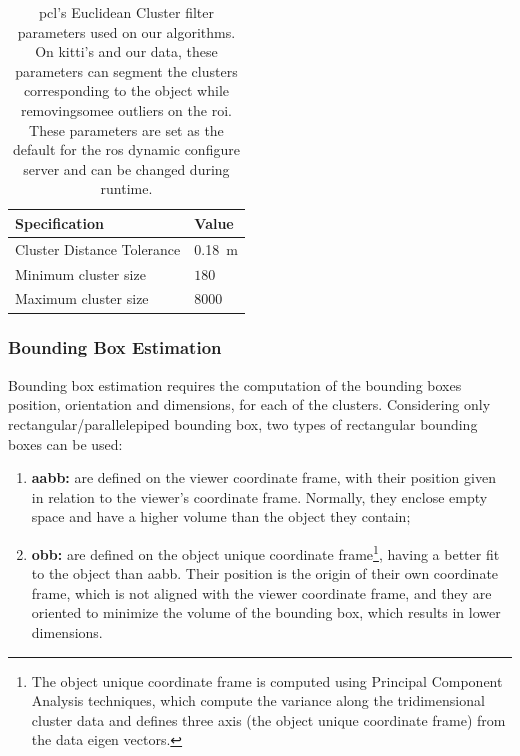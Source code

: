 \begin{table}[H]
	\centering
	\renewcommand{\arraystretch}{1.2}
	\begin{tabular}{@{}p{6cm}l@{}}
	 \toprule
	 Specification & Value \\
	 \midrule
	 Cluster Distance Tolerance & \SI{0.18}{\meter}\footnotemark \\
	 Minimum cluster size & $180$ \\
	 Maximum cluster size & $8000$ \\
	 \bottomrule
	\end{tabular}
	\caption{\ac{pcl}'s Euclidean Cluster filter parameters used on our algorithms. On \ac{kitti}'s and our data, these parameters can segment the clusters corresponding to the object while removingsomee outliers on the \ac{roi}. These parameters are set as the default for the \ac{ros} dynamic configure server and can be changed during runtime.}
	\label{tab:euclidian-cluster-specs}
\end{table}


\subsubsection{Bounding Box Estimation}
\label{subsubsec:object-detection:bounding-box-estimation}
Bounding box estimation requires the computation of the bounding boxes position, orientation and dimensions, for each of the clusters. Considering only rectangular/parallelepiped bounding box, two types of rectangular bounding boxes can be used:

\begin{enumerate}
	\item \textbf{\ac{aabb}:} are defined on the viewer coordinate frame, with their position given in relation to the viewer's coordinate frame. Normally, they enclose empty space and have a  higher volume than the object they contain;
	\item \textbf{\ac{obb}:} are defined on the object unique coordinate frame\footnote{The object unique coordinate frame is computed using Principal Component Analysis techniques, which compute the variance along the tridimensional cluster data and defines three axis (the object unique coordinate frame) from the data eigen vectors.}, having a better fit to the object than \ac{aabb}. Their position is the origin of their own coordinate frame, which is not aligned with the viewer coordinate frame, and they are oriented to minimize the volume of the bounding box, which results in lower dimensions.
\end{enumerate}

